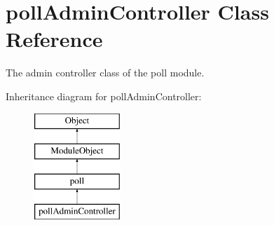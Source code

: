 \hypertarget{classpollAdminController}{\section{poll\-Admin\-Controller Class Reference}
\label{classpollAdminController}
}


The admin controller class of the poll module.  


Inheritance diagram for poll\-Admin\-Controller\-:\begin{figure}[H]
\begin{center}
\leavevmode
\includegraphics[height=4.000000cm]{classpollAdminController}
\end{center}
\end{figure}
